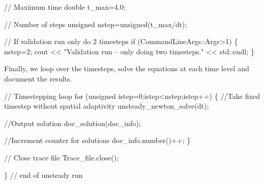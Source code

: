 \begin{DoxyCodeInclude}

 \textcolor{comment}{// Maximum time}
 \textcolor{keywordtype}{double} t\_max=4.0;

 \textcolor{comment}{// Number of steps}
 \textcolor{keywordtype}{unsigned} nstep=unsigned(t\_max/dt);

 \textcolor{comment}{// If validation run only do 2 timesteps}
 \textcolor{keywordflow}{if} (CommandLineArgs::Argc>1)
  \{ 
   nstep=2; 
   cout << \textcolor{stringliteral}{"Validation run -- only doing two timesteps."} << std::endl;
  \}

\end{DoxyCodeInclude}


Finally, we loop over the timesteps, solve the equations at each time level and document the results.


\begin{DoxyCodeInclude}
 
 \textcolor{comment}{// Timestepping loop}
 \textcolor{keywordflow}{for} (\textcolor{keywordtype}{unsigned} istep=0;istep<nstep;istep++)
  \{
   \textcolor{comment}{//Take fixed timestep without spatial adaptivity}
   unsteady\_newton\_solve(dt);
      
   \textcolor{comment}{//Output solution}
   doc\_solution(doc\_info);
     
   \textcolor{comment}{//Increment counter for solutions }
   doc\_info.number()++;
  \}

 \textcolor{comment}{// Close trace file}
 Trace\_file.close();

\} \textcolor{comment}{// end of unsteady run}

\end{DoxyCodeInclude}




 


